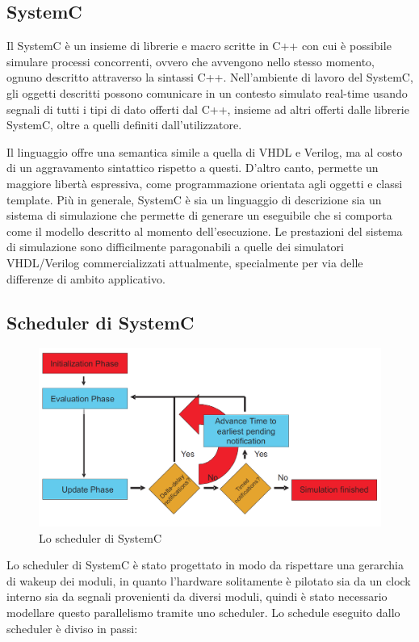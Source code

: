 \documentclass[a4paper,titlepage]{book}
\begin{document}
\subsection{SystemC}
Il SystemC è un insieme di librerie e macro scritte in C++ con cui è possibile simulare processi concorrenti, ovvero che avvengono nello stesso momento, ognuno descritto attraverso la sintassi C++. Nell'ambiente di lavoro del SystemC, gli oggetti descritti possono comunicare in un contesto simulato real-time usando segnali di tutti i tipi di dato offerti dal C++, insieme ad altri offerti dalle librerie SystemC, oltre a quelli definiti dall'utilizzatore.

Il linguaggio offre una semantica simile a quella di VHDL e Verilog, ma al costo di un aggravamento sintattico rispetto a questi. D'altro canto, permette un maggiore libertà espressiva, come programmazione orientata agli oggetti e classi template. Più in generale, SystemC è sia un linguaggio di descrizione sia un sistema di simulazione che permette di generare un eseguibile che si comporta come il modello descritto al momento dell'esecuzione. Le prestazioni del sistema di simulazione sono difficilmente paragonabili a quelle dei simulatori VHDL/Verilog commercializzati attualmente, specialmente per via delle differenze di ambito applicativo. 

\subsection{Scheduler di SystemC}

\begin{figure}
\centering
\includegraphics[scale=0.6]{scheduler_systemc.png}
\caption{Lo scheduler di SystemC}\label{fig:schedsysc}
\end{figure}

Lo scheduler di SystemC è stato progettato in modo da rispettare una gerarchia di wakeup dei moduli, in quanto l'hardware solitamente è pilotato sia da un clock interno sia da segnali provenienti da diversi moduli, quindi è stato necessario modellare questo parallelismo tramite uno scheduler. Lo schedule eseguito dallo scheduler è diviso in passi:
\end{document}
